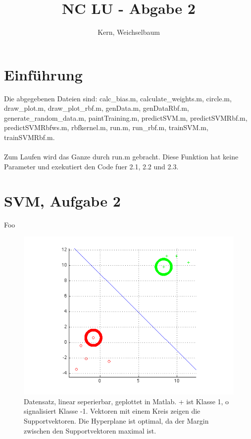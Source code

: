\documentclass[12pt]{article}
\title{NC LU - Abgabe 2}
\author{Kern, Weichselbaum}
\begin{document}
	
\maketitle	

\section{Einführung}

Die abgegebenen Dateien sind: calc_bias.m, calculate_weights.m, circle.m, draw_plot.m, draw_plot_rbf.m, genData.m, genDataRbf.m, generate_random_data.m, paintTraining.m, predictSVM.m, predictSVMRbf.m, predictSVMRbfws.m, rbfkernel.m, run.m, run_rbf.m, trainSVM.m, trainSVMRbf.m.
\\
\\
Zum Laufen wird das Ganze durch run.m gebracht. Diese Funktion hat keine Parameter und exekutiert den Code fuer 2.1, 2.2 und 2.3.

\section{SVM, Aufgabe 2}

Foo

\begin{figure}[htp]
	\centering
	\includegraphics[width=1\textwidth]{linear_sep_data_plot}
	\caption{Datensatz, linear seperierbar, geplottet in Matlab. + ist Klasse 1, o signalisiert Klasse -1. Vektoren mit einem Kreis zeigen die Supportvektoren. Die Hyperplane ist optimal, da der Margin zwischen den Supportvektoren maximal ist.}
	\label{fig:linear_sep_data_plot}
\end{figure}
	
\end{document}
